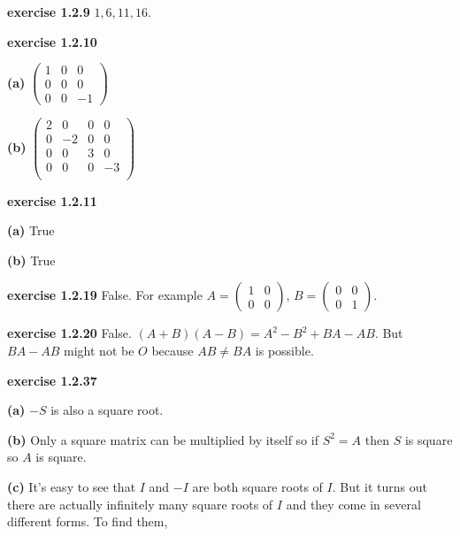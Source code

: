 \documentclass[oneside,12pt]{amsart}
\begin{document}
\smallskip

\textbf{exercise 1.2.9}
$1,6,11,16$.

\smallskip

\textbf{exercise 1.2.10}

\textbf{(a)}
$
\begin{pmatrix}
1 & 0 & 0 \\
0 & 0 & 0 \\
0 & 0 & -1
\end{pmatrix}
$

\smallskip

\textbf{(b)}
$
\begin{pmatrix}
2 & 0 & 0 & 0 \\
0 & -2 & 0 & 0\\
0 & 0 & 3 & 0 \\
0 & 0 & 0 & -3 \\
\end{pmatrix}
$


\smallskip

\textbf{exercise 1.2.11}

\textbf{(a)} True

\smallskip

\textbf{(b)} True

\smallskip

\textbf{exercise 1.2.19}
False. For example
$A=\begin{pmatrix}
1 & 0 \\
0 & 0
\end{pmatrix}$, $B=\begin{pmatrix}
0 & 0 \\
0 & 1
\end{pmatrix}$.


\smallskip

\textbf{exercise 1.2.20} False.
$(A+B)(A-B) = A^2 - B^2 + BA - AB$.
But $BA - AB$ might not be $O$ because
$AB\not=BA$ is possible.

\smallskip

\textbf{exercise 1.2.37}

\textbf{(a)} $-S$ is also a square root.

\smallskip

\textbf{(b)} Only a square matrix can be multiplied by itself so if
$S^2 = A$ then $S$ is square so $A$ is square.

\smallskip

\textbf{(c)} It's easy to see that $I$ and $-I$ are both square roots of
$I$. But it turns out there are actually infinitely many square roots of $I$
and they come in several different forms.
To find them,
\end{document}
